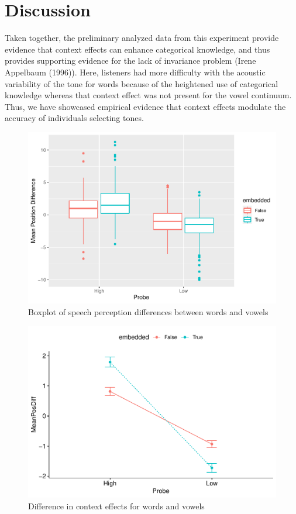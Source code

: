 \documentclass[
  man]{apa6}
\begin{document}
\hypertarget{discussion}{%
\section{Discussion}\label{discussion}}

Taken together, the preliminary analyzed data from this experiment provide evidence that context effects can enhance categorical knowledge, and thus provides supporting evidence for the lack of invariance problem (Irene Appelbaum (1996)). Here, listeners had more difficulty with the acoustic variability of the tone for words because of the heightened use of categorical knowledge whereas that context effect was not present for the vowel continuum. Thus, we have showcased empirical evidence that context effects modulate the accuracy of individuals selecting tones.



\begin{figure}
\centering
\includegraphics{FinalScientificReport_files/figure-latex/GGPlotBoxplot-1.pdf}
\caption{\label{fig:GGPlotBoxplot}Boxplot of speech perception differences between words and vowels}
\end{figure}



\begin{figure}
\centering
\includegraphics{FinalScientificReport_files/figure-latex/GGPlotLine-1.pdf}
\caption{\label{fig:GGPlotLine}Difference in context effects for words and vowels}
\end{figure}
\end{document}
